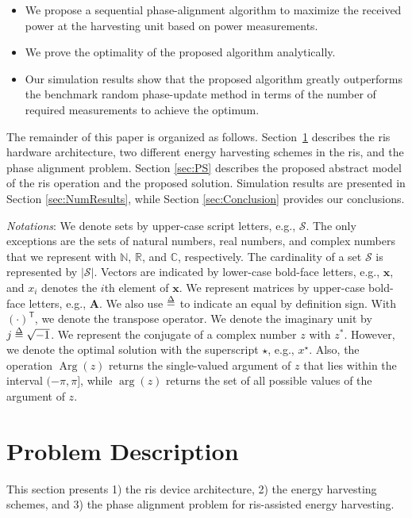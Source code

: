 \documentclass[conference]{IEEEtran}
\begin{document}
\begin{itemize}
    \item We propose a sequential phase-alignment algorithm to maximize the received power at the harvesting unit based on power measurements.
    \item We prove the optimality of the proposed algorithm analytically.
    \item Our simulation results show that the proposed algorithm greatly outperforms the benchmark random phase-update method in terms of the number of required measurements to achieve the optimum.
\end{itemize}

The remainder of this paper is organized as follows. Section~\ref{sec:PF} describes the \gls*{ris} hardware architecture, two different energy harvesting schemes in the \gls*{ris}, and the phase alignment problem. Section \ref{sec:PS} describes the proposed abstract model of the \gls*{ris} operation and the proposed solution. Simulation results are presented in Section \ref{sec:NumResults}, while Section \ref{sec:Conclusion} provides our conclusions.


\textit{Notations}: We denote sets by upper-case script letters, e.g., $\mathcal{S}$. The only exceptions are the sets of natural numbers, real numbers, and complex numbers that we  represent with $\mathbb{N}$, $\mathbb{R}$, and $\mathbb{C}$, respectively.  The cardinality of a set $\mathcal{S}$ is represented by $|\mathcal{S}|$. Vectors are indicated by lower-case bold-face letters, e.g., $\bm{x}$, and $x_{i}$ denotes the $i$th element of $\bm{x}$. We represent matrices by upper-case bold-face letters, e.g., $\bm{A}$. We also use $\delequal$ to indicate an equal by definition sign. With $\left(\cdot\right)^{\mathsf{T}}$, we denote the transpose operator. We denote the imaginary unit by $j\delequal\sqrt{-1}$. We represent the conjugate of a complex number $z$ with $z^{*}$. However, we denote the optimal solution with the superscript ${\star}$, e.g., $x^{\star}$. Also, the operation $\operatorname{Arg}{\left(z\right)}$ returns the single-valued argument of $z$ that lies within the interval $(-\pi, \pi]$, while $\arg{\left(z\right)}$ returns the set of all possible values of the argument of $z$.

\section{Problem Description}\label{sec:PF}
This section presents 1) the \gls*{ris} device architecture, 2) the energy harvesting schemes, and 3) the phase alignment problem for \gls*{ris}-assisted energy harvesting.
\end{document}
